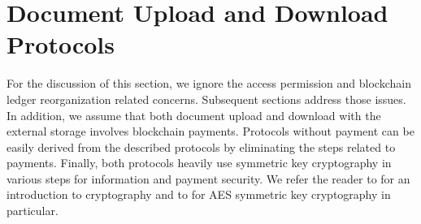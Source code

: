 \section{Document Upload and Download Protocols}
\label{s-updown}
For the discussion of this section, we ignore the access permission and blockchain ledger reorganization related concerns. Subsequent sections address those issues. In addition, we assume that both document upload and download with the external storage involves blockchain payments. Protocols without payment can be easily derived from the described protocols by eliminating the steps related to payments. Finally, both protocols heavily use symmetric key cryptography in various steps for information and payment security. We refer the reader to \cite{1455525} for an introduction to cryptography and to \cite{Daemen99aesproposal:} for AES symmetric key cryptography in particular. 

